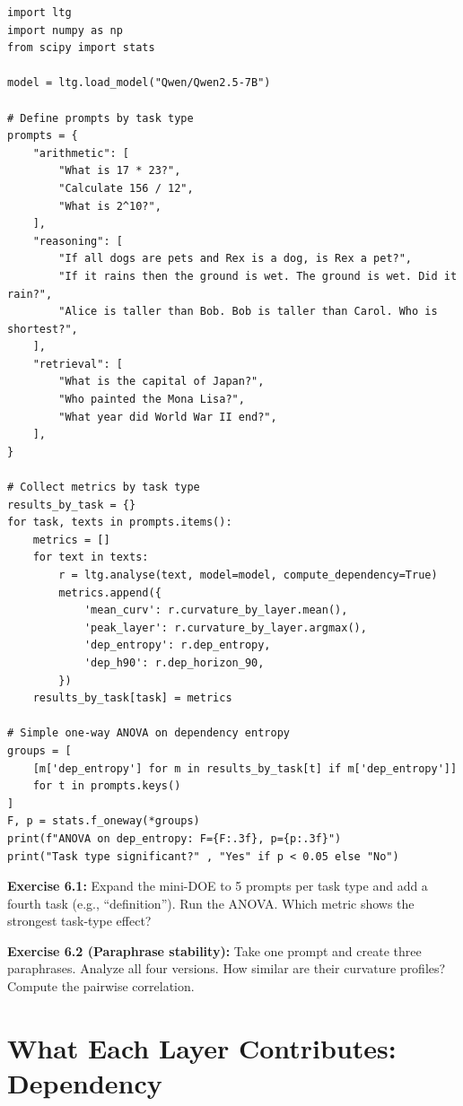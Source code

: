 \documentclass[11pt, twoside, openright]{memoir}
\begin{document}
\begin{lstlisting}[caption={Mini factorial experiment with ltg}]
import ltg
import numpy as np
from scipy import stats

model = ltg.load_model("Qwen/Qwen2.5-7B")

# Define prompts by task type
prompts = {
    "arithmetic": [
        "What is 17 * 23?",
        "Calculate 156 / 12",
        "What is 2^10?",
    ],
    "reasoning": [
        "If all dogs are pets and Rex is a dog, is Rex a pet?",
        "If it rains then the ground is wet. The ground is wet. Did it rain?",
        "Alice is taller than Bob. Bob is taller than Carol. Who is shortest?",
    ],
    "retrieval": [
        "What is the capital of Japan?",
        "Who painted the Mona Lisa?",
        "What year did World War II end?",
    ],
}

# Collect metrics by task type
results_by_task = {}
for task, texts in prompts.items():
    metrics = []
    for text in texts:
        r = ltg.analyse(text, model=model, compute_dependency=True)
        metrics.append({
            'mean_curv': r.curvature_by_layer.mean(),
            'peak_layer': r.curvature_by_layer.argmax(),
            'dep_entropy': r.dep_entropy,
            'dep_h90': r.dep_horizon_90,
        })
    results_by_task[task] = metrics

# Simple one-way ANOVA on dependency entropy
groups = [
    [m['dep_entropy'] for m in results_by_task[t] if m['dep_entropy']]
    for t in prompts.keys()
]
F, p = stats.f_oneway(*groups)
print(f"ANOVA on dep_entropy: F={F:.3f}, p={p:.3f}")
print("Task type significant?" , "Yes" if p < 0.05 else "No")
\end{lstlisting}

\begin{tryit}
\textbf{Exercise 6.1:} Expand the mini-DOE to 5 prompts per task type and
add a fourth task (e.g., ``definition''). Run the ANOVA. Which metric shows
the strongest task-type effect?

\textbf{Exercise 6.2 (Paraphrase stability):} Take one prompt and create
three paraphrases. Analyze all four versions. How similar are their curvature
profiles? Compute the pairwise correlation.
\end{tryit}


\chapter{What Each Layer Contributes: Dependency}
\label{chap:dependency}
\end{document}
